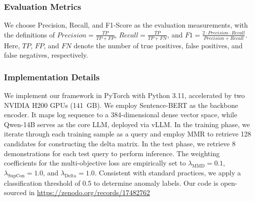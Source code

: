 \documentclass[lettersize,journal]{IEEEtran}
\begin{document}
\subsubsection{Evaluation Metrics}
We choose Precision, Recall, and F1-Score as the evaluation measurements, with the definitions of $\mathit{Precision} = \frac{\mathit{TP}}{\mathit{TP}+\mathit{FP}}$, $\mathit{Recall} = \frac{\mathit{TP}}{\mathit{TP}+\mathit{FN}}$, and $\mathit{F1} = \frac{2 \cdot \mathit{Precision} \cdot \mathit{Recall}}{\mathit{Precision} + \mathit{Recall}}$. Here, $\mathit{TP}$, $\mathit{FP}$, and $\mathit{FN}$ denote the number of true positives, false positives, and false negatives, respectively. 

\subsubsection{Implementation Details}
We implement our framework in PyTorch with Python 3.11, accelerated by two NVIDIA H200 GPUs (141~GB). We employ Sentence-BERT as the backbone encoder. It maps log sequence to a 384-dimensional dense vector space, while Qwen-14B serves as the core LLM, deployed via vLLM. In the training phase, we iterate through each training sample as a query and employ MMR to retrieve 128 candidates for constructing the delta matrix. In the test phase, we retrieve 8 demonstrations for each test query to perform inference. The weighting coefficients for the multi-objective loss are empirically set to $\lambda_{\text{MMD}} = 0.1$, $\lambda_{\text{SupCon}} = 1.0$, and $\lambda_{\text{Delta}} = 1.0$. Consistent with standard practices, we apply a classification threshold of 0.5 to determine anomaly labels. Our code is open-sourced in \url{https://zenodo.org/records/17482762}
\end{document}
